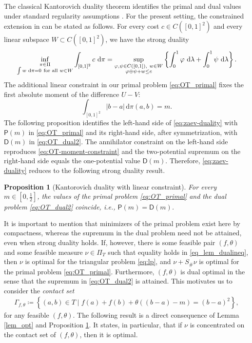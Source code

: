 \documentclass{article}
\newtheorem{proposition}[theorem]{Proposition}
\newcommand{\de}{\mathrm{\,d}}
\newcommand{\lam}{\lambda}
\begin{document}
The classical Kantorovich duality theorem identifies the primal and dual values under standard regularity assumptions \cite[Theorem~5.10]{villani2009optimal}.
For the present setting, the constrained extension in \cite[Theorem~2.1]{zaev2015monge} can be stated as follows.
For every cost \(c\in C([0,1]^2)\) and every linear subspace \(W\subset C([0,1]^2)\),  we have the strong duality
\begin{equation}\label{eq:zaev-duality}
\inf_{\substack{\pi\in\Pi\\
        \int w\,\de\pi=0\ \text{for all }w\in W}}
    \int_{[0,1]^2}c\,\de\pi \\
=
\sup_{\substack{\varphi,\psi\in C([0,1]),\ w\in W\\
        \varphi\oplus\psi+w\leq c}}
    \left\{
        \int_0^1\varphi\,\de\lam
        +
        \int_0^1\psi\,\de\lam
    \right\}.
\end{equation}
The additional linear constraint in our primal problem \eqref{eq:OT_primal} fixes the first absolute moment of the difference \(U-V\):
\begin{equation}\label{eq:OT-moment-constraint}
    \int_{[0,1]^2}|b-a|\de\pi(a,b)=m.
\end{equation}
The following proposition identifies the left-hand side of \eqref{eq:zaev-duality} with \(\mathsf P(m)\) in \eqref{eq:OT_primal} and its right-hand side, after symmetrization, with \(\mathsf D(m)\) in \eqref{eq:OT_dual2}.
The annihilator constraint on the left-hand side reproduces \eqref{eq:OT-moment-constraint} and the two-potential supremum on the right-hand side equals the one-potential value \(\mathsf D(m)\).
Therefore, \eqref{eq:zaev-duality} reduces to the following strong duality result.

\begin{proposition}[Kantorovich duality with linear constraint]\label{prop_KR_duality}
    For every \(m\in[0,\tfrac12]\), the values of the primal problem \eqref{eq:OT_primal} and the dual problem \eqref{eq:OT_dual2} coincide, i.e., \(\mathsf{P}(m)=\mathsf{D}(m)\).
\end{proposition}

It is important to mention that minimizers of the primal problem exist here by compactness, whereas the supremum in the dual problem need not be attained, even when strong duality holds. 
If, however, there is some feasible pair \((f,\theta)\) and some feasible measure \(\nu\in\Pi_T\) such that equality holds in \eqref{eq_lem_dualineq}, then \(\nu\) is optimal for the triangular problem \eqref{eq:lp}, and \(\nu+S_\#\nu\) is optimal for the primal problem \eqref{eq:OT_primal}.
Furthermore, \((f,\theta)\) is dual optimal in the sense that the supremum in \eqref{eq:OT_dual2} is attained.
This motivates us to consider the \emph{contact set}
\begin{align}\label{def_contactset}
    \Gamma_{f,\theta}\coloneqq\left\{(a,b)\in T \mid f(a)+f(b)+\theta((b-a)-m)=(b-a)^2\right\},
\end{align}
for any feasible \((f,\theta)\).
The following result is a direct consequence of Lemma \ref{lem_opt} and Proposition \ref{prop_KR_duality}.
It states, in particular, that if \(\nu\) is concentrated on the contact set of \((f,\theta)\), then it is optimal.
\end{document}
